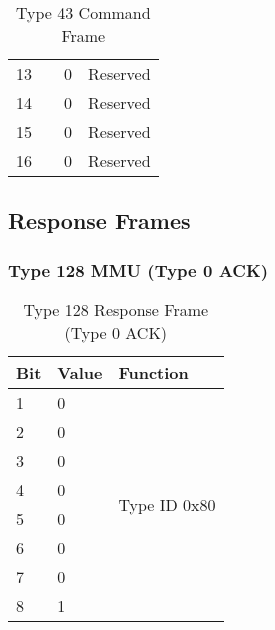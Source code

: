 \documentclass[]{article}
\begin{document}
\begin{table}[ht]
\begin{tabular}{llll}
		13           &                    & 0                 & Reserved                      \\
		14           &                    & 0                 & Reserved                      \\
		15           &                    & 0                 & Reserved                      \\
		16           &                    & 0                 & Reserved                      \\ \hline
	\end{tabular}
	\caption{Type 43 Command Frame}
	\label{tab:type-43-frame}
\end{table}

\clearpage

\subsection {Response Frames}

\subsubsection {Type 128 MMU (Type 0 ACK)}

\begin{table}[ht]
	\centering
	\begin{tabular}{lll}
		\hline
		\textbf{Bit} & \textbf{Value} & \textbf{Function}             \\ \hline
		1            & 0              & \multirow{8}{*}{Type ID 0x80} \\
		2            & 0              &                               \\
		3            & 0              &                               \\
		4            & 0              &                               \\
		5            & 0              &                               \\
		6            & 0              &                               \\
		7            & 0              &                               \\
		8            & 1              &                               \\ \hline
	\end{tabular}
	\caption{Type 128 Response Frame (Type 0 ACK)}
	\label{tab:type-128-frame}
\end{table}
\end{document}
